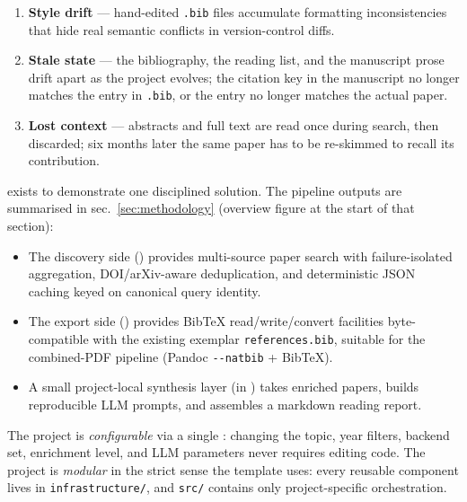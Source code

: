 \documentclass[
]{article}
\providecommand{\tightlist}{%
  \setlength{\itemsep}{0pt}\setlength{\parskip}{0pt}}
\begin{document}
\begin{enumerate}
\def\labelenumi{\arabic{enumi}.}
\tightlist
\item
  \textbf{Style drift} --- hand-edited \texttt{.bib} files accumulate
  formatting inconsistencies that hide real semantic conflicts in
  version-control diffs.
\item
  \textbf{Stale state} --- the bibliography, the reading list, and the
  manuscript prose drift apart as the project evolves; the citation key
  in the manuscript no longer matches the entry in \texttt{.bib}, or the
  entry no longer matches the actual paper.
\item
  \textbf{Lost context} --- abstracts and full text are read once during
  search, then discarded; six months later the same paper has to be
  re-skimmed to recall its contribution.
\end{enumerate}

 exists to demonstrate one disciplined
solution. The pipeline outputs are summarised in
sec.~\ref{sec:methodology} (overview figure at the start of that
section):

\begin{itemize}
\tightlist
\item
  The discovery side
  (\href{../../../../infrastructure/search/}{})
  provides multi-source paper search with failure-isolated aggregation,
  DOI/arXiv-aware deduplication, and deterministic JSON caching keyed on
  canonical query identity.
\item
  The export side
  (\href{../../../../infrastructure/reference/}{})
  provides BibTeX read/write/convert facilities byte-compatible with the
  existing exemplar \texttt{references.bib}, suitable for the
  combined-PDF pipeline (Pandoc \texttt{-\/-natbib} + BibTeX).
\item
  A small project-local synthesis layer (in
  \href{../src/synthesis.py}{}) takes enriched
  papers, builds reproducible LLM prompts, and assembles a markdown
  reading report.
\end{itemize}

The project is \emph{configurable} via a single
: changing the topic, year filters,
backend set, enrichment level, and LLM parameters never requires editing
code. The project is \emph{modular} in the strict sense the template
uses: every reusable component lives in \texttt{infrastructure/}, and
\texttt{src/} contains only project-specific orchestration.
\end{document}
